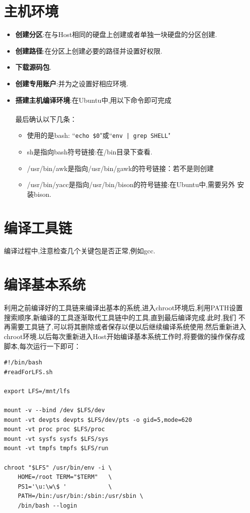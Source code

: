 \section{主机环境}
\begin{itemize}
\item \textbf{创建分区}:在与Host相同的硬盘上创建或者单独一块硬盘的分区创建.

\item \textbf{创建路径}:在分区上创建必要的路径并设置好权限.

\item \textbf{下载源码包}.

\item \textbf{创建专用账户}:并为之设置好相应环境.

\item \textbf{搭建主机编译环境}:在Ubuntu中,用以下命令即可完成\\
\\
最后确认以下几条：
\begin{itemize}
\item  使用的是bash: ``\texttt{echo \$0}"或``\texttt{env | grep SHELL}"

\item sh是指向bash符号链接:在/bin目录下查看.

\item /usr/bin/awk是指向/usr/bin/gawk的符号链接：若不是则创建\\

\item /usr/bin/yacc是指向/usr/bin/bison的符号链接:在Ubuntu中,需要另外
安装bison.

\end{itemize}

\end{itemize}

\section{编译工具链}
编译过程中,注意检查几个关键包是否正常,例如gcc.

\section{编译基本系统}
利用之前编译好的工具链来编译出基本的系统,进入chroot环境后,利用PATH设置
搜索顺序,新编译的工具逐渐取代工具链中的工具,直到最后编译完成.此时,我们
不再需要工具链了,可以将其删除或者保存以便以后继续编译系统使用.然后重新进入
chroot环境.以后每次重新进入Host开始编译基本系统工作时,将要做的操作保存成脚本,每次运行一下即可：
\begin{verbatim}
#!/bin/bash
#readForLFS.sh

export LFS=/mnt/lfs

mount -v --bind /dev $LFS/dev
mount -vt devpts devpts $LFS/dev/pts -o gid=5,mode=620
mount -vt proc proc $LFS/proc
mount -vt sysfs sysfs $LFS/sys
mount -vt tmpfs tmpfs $LFS/run

chroot "$LFS" /usr/bin/env -i \
    HOME=/root TERM="$TERM"   \
    PS1='\u:\w\$ '            \
    PATH=/bin:/usr/bin:/sbin:/usr/sbin \
    /bin/bash --login
\end{verbatim}

